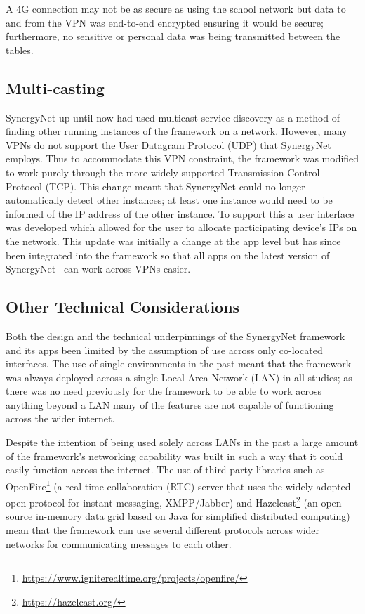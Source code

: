 \documentclass[a4paper,11pt]{article}
\begin{document}
A 4G connection may not be as secure as using the school network but data to and from the VPN was end-to-end encrypted ensuring it would be secure; furthermore, no sensitive or personal data was being transmitted between the tables.

\subsection{Multi-casting}

SynergyNet up until now had used multicast service discovery as a method of finding other running instances of the framework on a network.
However, many VPNs do not support the User Datagram Protocol (UDP) that SynergyNet employs.
Thus to accommodate this VPN constraint, the framework was modified to work purely through the more widely supported Transmission Control Protocol (TCP).
This change meant that SynergyNet could no longer automatically detect other instances; at least one instance would need to be informed of the IP address of the other instance.
To support this a user interface was developed which allowed for the user to allocate participating device's IPs on the network.
This update was initially a change at the app level but has since been integrated into the framework so that all apps on the latest version of SynergyNet~\cite{hatch:2011} can work across VPNs easier.

\subsection{Other Technical Considerations}

Both the design and the technical underpinnings of the SynergyNet framework and its apps been limited by the assumption of use across only co-located interfaces.
The use of single environments in the past meant that the framework was always deployed across a single Local Area Network (LAN) in all studies; as there was no need previously for the framework to be able to work across anything beyond a LAN many of the features are not capable of functioning across the wider internet.

Despite the intention of being used solely across LANs in the past a large amount of the framework's networking capability was built in such a way that it could easily function across the internet.
The use of third party libraries such as OpenFire\footnote{\url{https://www.igniterealtime.org/projects/openfire/}} (a real time collaboration (RTC) server that uses the widely adopted open protocol for instant messaging, XMPP/Jabber) and Hazelcast\footnote{\url{https://hazelcast.org/}} (an open source in-memory data grid based on Java for simplified distributed computing) mean that the framework can use several different protocols across wider networks for communicating messages to each other.
\end{document}

